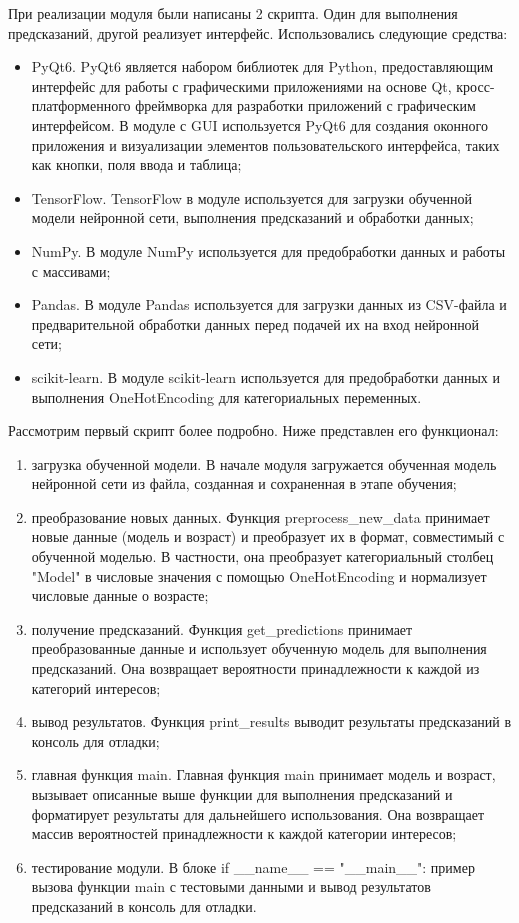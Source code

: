 При реализации модуля были написаны 2 скрипта. Один для выполнения предсказаний, другой реализует интерфейс. Использовались следующие средства:
\begin{itemize}
    \item PyQt6. PyQt6 является набором библиотек для Python, предоставляющим интерфейс для работы с графическими приложениями на основе Qt, кросс-платформенного фреймворка для разработки приложений с графическим интерфейсом. В модуле с GUI используется PyQt6 для создания оконного приложения и визуализации элементов пользовательского интерфейса, таких как кнопки, поля ввода и таблица;
    \item TensorFlow. TensorFlow в модуле используется для загрузки обученной модели нейронной сети, выполнения предсказаний и обработки данных;
    \item NumPy. В модуле NumPy используется для предобработки данных и работы с массивами;
    \item Pandas. В модуле Pandas используется для загрузки данных из CSV-файла и предварительной обработки данных перед подачей их на вход нейронной сети;
    \item scikit-learn. В модуле scikit-learn используется для предобработки данных и выполнения OneHotEncoding для категориальных переменных. 
\end{itemize}

Рассмотрим первый скрипт более подробно. Ниже представлен его функционал:
\begin{enumerate}
    \item загрузка обученной модели. В начале модуля загружается обученная модель нейронной сети из файла, созданная и сохраненная в этапе обучения;
    \item преобразование новых данных. Функция preprocess\_new\_data принимает новые данные (модель и возраст) и преобразует их в формат, совместимый с обученной моделью. В частности, она преобразует категориальный столбец "Model" в числовые значения с помощью OneHotEncoding и нормализует числовые данные о возрасте;
    \item получение предсказаний. Функция get\_predictions принимает преобразованные данные и использует обученную модель для выполнения предсказаний. Она возвращает вероятности принадлежности к каждой из категорий интересов;
    \item вывод результатов. Функция print\_results выводит результаты предсказаний в консоль для отладки;
    \item главная функция main. Главная функция main принимает модель и возраст, вызывает описанные выше функции для выполнения предсказаний и форматирует результаты для дальнейшего использования. Она возвращает массив вероятностей принадлежности к каждой категории интересов;
    \item тестирование модули. В блоке if \_\_name\_\_ == "\_\_main\_\_": пример вызова функции main с тестовыми данными и вывод результатов предсказаний в консоль для отладки.
\end{enumerate}

